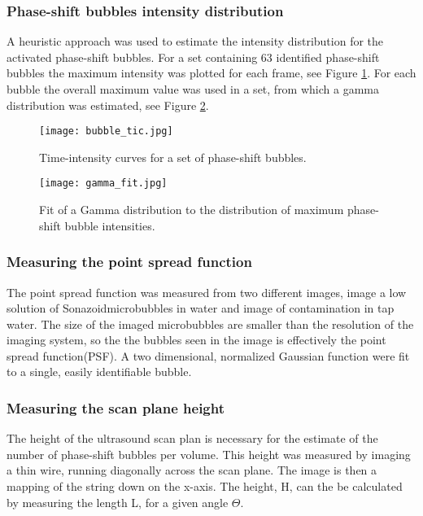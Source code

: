\subsubsection{Phase-shift bubbles intensity distribution}
\label{PS intensity distribution}
A heuristic approach was used to estimate the intensity distribution for the activated phase-shift bubbles. For a set containing 63 identified phase-shift bubbles the maximum intensity was plotted for each frame, see Figure \ref{Fig:bubble_tic}. For each bubble the overall maximum value was used in a set, from which a gamma distribution was estimated, see Figure \ref{Fig:gamma_fit}.

\begin{figure}[h]
  \centering
  \label{Fig:bubble_tic}
  \texttt{[image: bubble\_tic.jpg]}
  \caption{Time-intensity curves for a set of phase-shift bubbles.}
\end{figure}
\begin{figure}[h]
  \centering
  \label{Fig:gamma_fit}
  \texttt{[image: gamma\_fit.jpg]}
  \caption{Fit of a Gamma distribution to the distribution of maximum phase-shift bubble intensities.}
\end{figure}

\subsubsection{Measuring the point spread function}
The point spread function was measured from two different images, image a low solution of Sonazoid\texttrademark microbubbles in water and image of contamination in tap water. The size of the imaged microbubbles are smaller than the resolution of the imaging system, so the the bubbles seen in the image is effectively the point spread function(PSF). A two dimensional, normalized Gaussian function were fit to a single, easily identifiable bubble. 

 
\subsubsection{Measuring the scan plane height}
The height of the ultrasound scan plan is necessary for the estimate of the number of phase-shift bubbles per volume. This height was measured by imaging a thin wire, running diagonally across the scan plane. The image is then a mapping of the string down on the x-axis. The height, H,  can the be calculated by measuring the length L, for a given angle $\Theta$.

